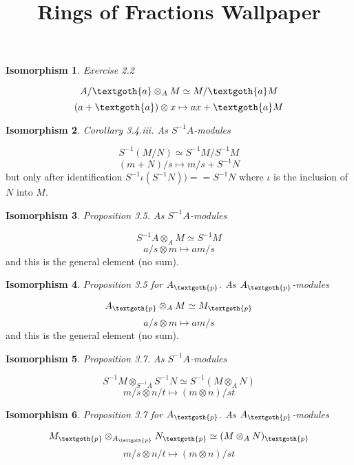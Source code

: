 \documentclass{article}
\title{Rings of Fractions Wallpaper}
\newtheorem{theorem}{Isomorphism}
\begin{document}
\maketitle

\begin{theorem}
Exercise 2.2
\end{theorem}

\[
A/\textgoth{a} \otimes_A M \simeq M/\textgoth{a}M
\]
\[
(a + \textgoth{a}) \otimes x \mapsto ax + \textgoth{a}M
\]

\vspace{10px}
\begin{theorem}
Corollary 3.4.iii. As $S^{-1}A$-modules
\end{theorem}

\[
S^{-1}(M/N) \simeq S^{-1}M/S^{-1}M
\]
\[
(m + N) / s \mapsto m/s + S^{-1}N 
\]
\noindent
but only after identification $S^{-1}\iota(S^{-1}N)) == S^{-1}N$ where $\iota$ is the inclusion of $N$ into $M$.

\vspace{10px}
\begin{theorem}
Proposition 3.5. As $S^{-1}A$-modules
\end{theorem}

\[
S^{-1}A \otimes_A M \simeq S^{-1}M
\]
\[
a/s \otimes m \mapsto am/s
\]
\noindent
and this is the general element (no sum).

\vspace{10px}
\begin{theorem}
Proposition 3.5 for $A_\textgoth{p}$. As $A_\textgoth{p}$-modules

\end{theorem}

\[
A_\textgoth{p} \otimes_A M \simeq M_\textgoth{p}
\]
\[
a/s \otimes m \mapsto am/s
\]
\noindent
and this is the general element (no sum).

\vspace{10px}
\begin{theorem}
Proposition 3.7. As $S^{-1}A$-modules
\end{theorem}

\[
S^{-1}M \otimes_{S^{-1}A} S^{-1}N \simeq  S^{-1}(M \otimes_A N)
\]
\[
m/s \otimes n/t \mapsto (m \otimes n)/st
\]

\vspace{10px}
\begin{theorem}
Proposition 3.7 for $A_\textgoth{p}$. As $A_\textgoth{p}$-modules
\end{theorem}

\[
M_\textgoth{p} \otimes_{A_\textgoth{p}} N_\textgoth{p} \simeq  (M \otimes_A N)_\textgoth{p}
\]
\[
m/s \otimes n/t \mapsto (m \otimes n)/st
\]
\end{document}
